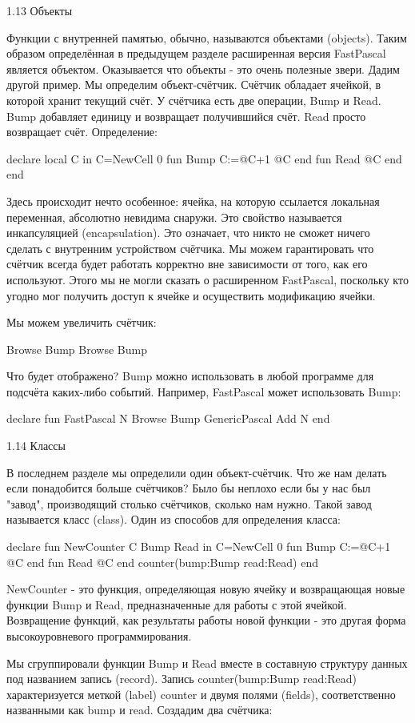 1.13 Объекты

Функции с внутренней памятью, обычно, называются объектами (objects). Таким образом определённая в предыдущем разделе расширенная версия FastPascal является объектом. Оказывается что объекты - это очень полезные звери. Дадим другой пример. Мы определим объект-счётчик. Счётчик обладает ячейкой, в которой хранит текущий счёт. У счётчика есть две операции, Bump и Read. Bump добавляет единицу и возвращает получившийся счёт. Read просто возвращает счёт. Определение:

declare
local C in
C={NewCell 0}
fun {Bump}
C:=@C+1
@C
end
fun {Read}
@C
end
end

Здесь происходит нечто особенное: ячейка, на которую ссылается локальная переменная, абсолютно невидима снаружи. Это свойство называется инкапсуляцией (encapsulation). Это означает, что никто не сможет ничего сделать с внутренним устройством счётчика. Мы можем гарантировать что счётчик всегда будет работать корректно вне зависимости от того, как его используют. Этого мы не могли сказать о расширенном FastPascal, поскольку кто угодно мог получить доступ к ячейке и осуществить модификацию ячейки.

Мы можем увеличить счётчик:

{Browse {Bump}}
{Browse {Bump}}

Что будет отображено? Bump можно использовать в любой программе для подсчёта каких-либо событий. Например, FastPascal может использовать Bump:

declare
fun {FastPascal N}
{Browse {Bump}}
{GenericPascal Add N}
end

1.14 Классы

В последнем разделе мы определили один объект-счётчик. Что же нам делать если понадобится больше счётчиков? Было бы неплохо если бы у нас был "завод", производящий столько счётчиков, сколько нам нужно. Такой завод называется класс (class). Один из способов для определения класса:

declare
fun {NewCounter}
C Bump Read in
C={NewCell 0}
fun {Bump}
C:=@C+1
@C
end
fun {Read}
@C
end
counter(bump:Bump read:Read)
end

NewCounter - это функция, определяющая новую ячейку и возвращающая новые функции Bump и Read, предназначенные для работы с этой ячейкой. Возвращение функций, как результаты работы новой функции - это другая форма высокоуровневого программирования.

Мы сгруппировали функции Bump и Read вместе в составную структуру данных под названием запись (record). Запись counter(bump:Bump read:Read) характеризуется меткой (label) counter и двумя полями (fields), соответственно названными как bump и read. Создадим два счётчика:

